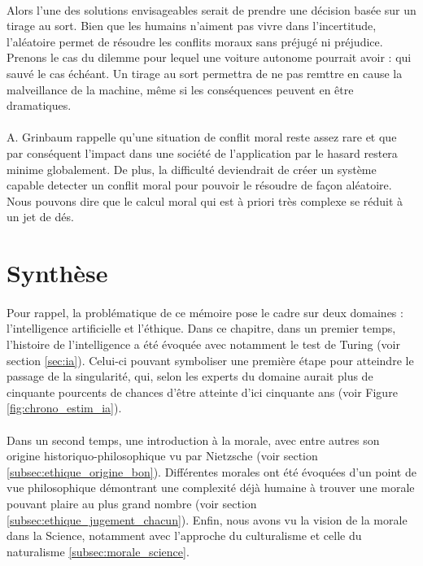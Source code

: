 \documentclass[10pt, french, a4paper]{report}
\begin{document}
\paragraph{}
Alors l'une des solutions envisageables serait de prendre une décision basée sur un tirage au sort. Bien que les humains n'aiment pas vivre dans l'incertitude, l'aléatoire permet de résoudre les conflits moraux sans préjugé ni préjudice. Prenons le cas du dilemme pour lequel une voiture autonome pourrait avoir : qui sauvé le cas échéant. Un tirage au sort permettra de ne pas remttre en cause la malveillance de la machine, même si les conséquences peuvent en être dramatiques.

\paragraph{}
A. Grinbaum rappelle qu'une situation de conflit moral reste assez rare et que par conséquent l'impact dans une société de l'application par le hasard restera minime globalement. De plus, la difficulté deviendrait de créer un système capable detecter un conflit moral pour pouvoir le résoudre de façon aléatoire. Nous pouvons dire que le calcul moral qui est à priori très complexe se réduit à un jet de dés.

\section{Synthèse}

\paragraph{}
Pour rappel, la problématique de ce mémoire pose le cadre sur deux domaines : l’intelligence artificielle et l’éthique. Dans ce chapitre, dans un premier temps, l’histoire de l’intelligence a été évoquée avec notamment le test de Turing (voir section \ref{sec:ia}). Celui-ci pouvant symboliser une première étape pour atteindre le passage de la singularité, qui, selon les experts du domaine aurait plus de cinquante pourcents de chances d’être atteinte d’ici cinquante ans (voir Figure \ref{fig:chrono_estim_ia}).

\paragraph{}
Dans un second temps, une introduction à la morale, avec entre autres son origine historiquo-philosophique vu par Nietzsche (voir section \ref{subsec:ethique_origine_bon}). Différentes morales ont été évoquées d’un point de vue philosophique démontrant une complexité déjà humaine à trouver une morale pouvant plaire au plus grand nombre (voir section \ref{subsec:ethique_jugement_chacun}). Enfin, nous avons vu la vision de la morale dans la Science, notamment avec l'approche du culturalisme et celle du naturalisme \ref{subsec:morale_science}.
\end{document}
